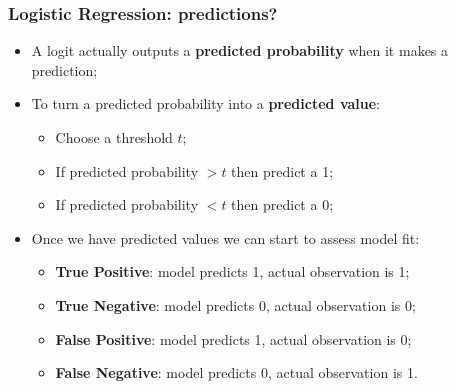 \documentclass[aspectratio=169]{beamer}
\theoremstyle{principle}
\begin{document}
\begin{frame}
\frametitle{Logistic Regression: predictions?}

\begin{itemize}
\item A logit actually outputs a \textbf{predicted probability} when it makes a prediction;
\bigskip
\bigskip

\item To turn a predicted probability into a \textbf{predicted value}:
\begin{itemize}
\item Choose a threshold $t$;
\item If predicted probability $> t$ then predict a 1;
\item If predicted probability $< t$ then predict a 0;
\end{itemize}
\bigskip
\bigskip

\item Once we have predicted values we can start to assess model fit:
\begin{itemize}
\item \textbf{True Positive}: model predicts 1, actual observation is 1;
\item \textbf{True Negative}: model predicts 0, actual observation is 0;
\item \textbf{False Positive}: model predicts 1, actual observation is 0;
\item \textbf{False Negative}: model predicts 0, actual observation is 1.
\end{itemize}

\end{itemize}

\end{frame}
\end{document}
